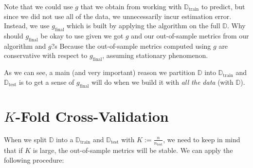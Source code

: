 \documentclass[12pt, a4paper]{article}
\theoremstyle{definition}
\begin{document}
	Note that we could use $g$ that we obtain from working with $\mathbb{D}_{\text{train}}$
	to predict, but since we did not use all of the data, we unnecessarily incur estimation
	error. Instead, we use $g_{\text{final}}$ which is built by applying
	the algorithm on the full $\mathbb{D}$. Why should $g_{\text{final}}$ be okay
	to use given we got $g$ and our out-of-sample metrics from our algorithm and $g$?s
	Because the out-of-sample metrics computed using $g$ are conservative with respect to
	$g_{\text{final}}$, assuming stationary phenomenon.
	
	As we can see, a main (and very important) reason we partition $\mathbb{D}$
	into $\mathbb{D}_{\text{train}}$ and $\mathbb{D}_{\text{test}}$ is to get a sense
	of $g_{\text{final}}$ will do when we build it with \textit{all the data}
	(with $\mathbb{D}$).
	\section*{$K$-Fold Cross-Validation}
	When we split $\mathbb{D}$ into a $\mathbb{D}_{\text{train}}$ and $\mathbb{D}_{\text{test}}$
	with $K:=\frac{n}{n_{\text{test}}}$, we need to keep in mind that if $K$ is large,
	the out-of-sample metrics will be stable. We can apply the following procedure:
\end{document}
